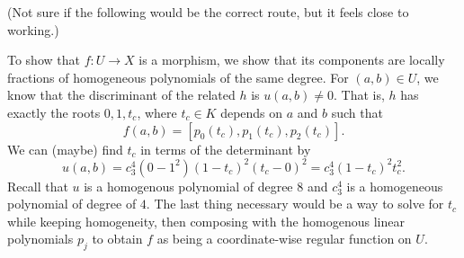 \documentclass[12pt]{article}
\newcommand{\<}{\langle}
\renewcommand{\>}{\rangle}
\begin{document}
(Not sure if the following would be the correct route, but it feels close to working.)

To show that $f : U \to X$ is a morphism, we show that its components are locally fractions of homogeneous polynomials of the same degree. For $(a, b) \in U$, we know that the discriminant of the related $h$ is $u(a, b) \ne 0$. That is, $h$ has exactly the roots $0, 1, t_c$, where $t_c \in K$ depends on $a$ and $b$ such that
\[
    f(a, b) = [p_0(t_c), p_1(t_c), p_2(t_c)].
\]
We can (maybe) find $t_c$ in terms of the determinant by
\[
    u(a, b) = c_3^4(0 - 1^2)(1 - t_c)^2(t_c - 0)^2
        = c_3^4(1 - t_c)^2t_c^2.
\]
Recall that $u$ is a homogenous polynomial of degree $8$ and $c_3^4$ is a homogeneous polynomial of degree of $4$. The last thing necessary would be a way to solve for $t_c$ while keeping homogeneity, then composing with the homogenous linear polynomials $p_j$ to obtain $f$ as being a coordinate-wise regular function on $U$.
\end{document}
